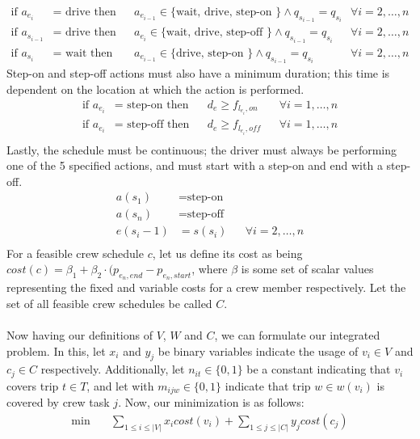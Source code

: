 \documentclass[]{article}
\begin{document}
\begin{align}
  \text{if } a_{e_i} &= \text{ drive}\text{ then} &&a_{e_{i-1}} \in \text{\{ wait, drive, step-on \}} \land q_{s_{i-1}} = q_{s_{i}} && \forall i = 2, \dots, n \\
  \text{if } a_{s_{i-1}} &= \text{ drive}\text{ then} &&a_{e_{i}} \in \text{\{ wait, drive, step-off \}} \land q_{s_{i-1}} = q_{s_{i}} && \forall i = 2, \dots, n \\
  \text{if } a_{s_{i}} &= \text{ wait}\text{ then} &&a_{e_{i-1}} \in \text{\{ drive, step-on \}} \land q_{s_{i-1}} = q_{s_{i}} && \forall i = 2, \dots, n
\end{align}
Step-on and step-off actions must also have a minimum duration; this time is dependent on the location at which the action is performed.
\begin{align}
  \text{if } a_{e_i} &= \text{ step-on}\text{ then} && d_{e} \geq f_{l_{e_i},on} && \forall i = 1, \dots, n \\
  \text{if } a_{e_i} &= \text{ step-off}\text{ then} && d_{e} \geq f_{l_{e_i},\textit{off}} && \forall i = 1, \dots, n \\
\end{align}
Lastly, the schedule must be continuous; the driver must always be performing one of the 5 specified actions, and must start with a step-on and end with a step-off.
\begin{align}
  a(s_1) &= \text{step-on} && \\
  a(s_n) &= \text{step-off} && \\
  e(s_i-1) &= s(s_i) && \forall i = 2, \dots, n \\
\end{align}
For a feasible crew schedule $c$, let us define its cost as being $cost(c) = \beta_1 + \beta_2 \cdot (p_{e_n,end} - p_{e_n,start}$, where $\beta$ is some set of scalar values representing the fixed and variable costs for a crew member respectively. Let the set of all feasible crew schedules be called $C$. \\\\
Now having our definitions of $V$, $W$ and $C$, we can formulate our integrated problem. In this, let $x_i$ and $y_j$ be binary variables indicate the usage of $v_i \in V$ and $c_j \in C$ respectively. Additionally, let $n_{it} \in \{ 0, 1 \}$ be a constant indicating that $v_i$ covers trip $t \in T$, and let with $m_{ijw} \in \{ 0, 1 \} $ indicate that trip $w \in w(v_i)$ is covered by crew task $j$. Now, our minimization is as follows:
\begin{align}
\min \quad
& \sum_{1 \leq i \leq |V|} x_{i}cost(v_i) + \sum_{1 \leq j \leq |C|} y_{j}cost(c_j)  
\end{align}
\end{document}
